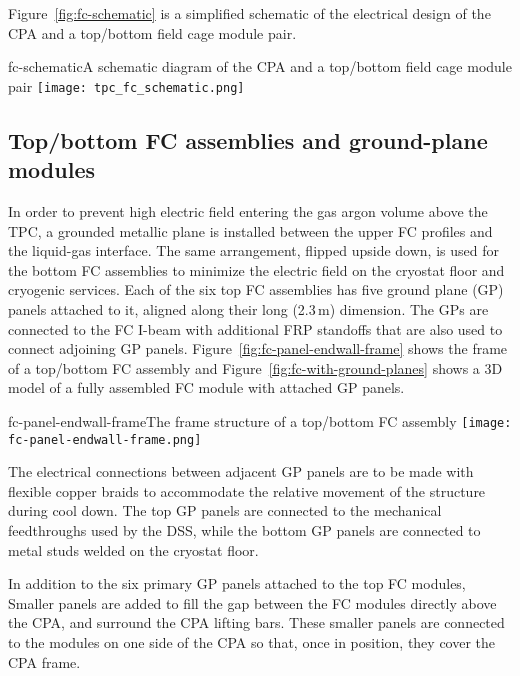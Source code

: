 Figure~\ref{fig:fc-schematic} is a simplified schematic of the electrical design of  the CPA and a top/bottom field cage module pair.

\begin{cdrfigure}{fc-schematic}{A schematic diagram of the CPA and a top/bottom field cage module pair}
\texttt{[image: tpc\_fc\_schematic.png]}
\end{cdrfigure}

\subsection{Top/bottom FC assemblies and ground-plane modules}

In order to prevent high electric field entering the gas argon volume above the TPC, a grounded metallic plane is installed between the upper FC profiles and the liquid-gas interface. The same arrangement, flipped upside down, is used for the bottom FC assemblies to minimize the electric field on the cryostat floor and cryogenic services. 
Each of the six top FC assemblies has five ground plane (GP) panels attached to it, aligned 
along their long %
(2.3\,m) dimension. The GPs are connected to the FC I-beam 
with additional FRP standoffs that are also used to connect adjoining GP panels. 
Figure~\ref{fig:fc-panel-endwall-frame} shows the frame of a top/bottom FC assembly and 
Figure~\ref{fig:fc-with-ground-planes} shows a 3D model of a fully assembled FC module with attached GP panels.

\begin{cdrfigure}{fc-panel-endwall-frame}{The frame structure of a top/bottom FC assembly}
\texttt{[image: fc-panel-endwall-frame.png]}
\end{cdrfigure}


The electrical connections between adjacent GP panels are to be made 
with flexible copper braids to accommodate the relative movement of the structure during cool down.  The top GP panels are connected to the mechanical feedthroughs used by the DSS, while the bottom GP panels are connected to metal studs welded on the cryostat floor.

In addition to the six primary GP panels attached to the top FC modules,
Smaller panels are added to fill the gap between the FC modules directly above the CPA, and surround the CPA lifting bars. These smaller panels are connected to the modules on one side of the CPA so that, once in position, they 
cover the CPA frame. 

